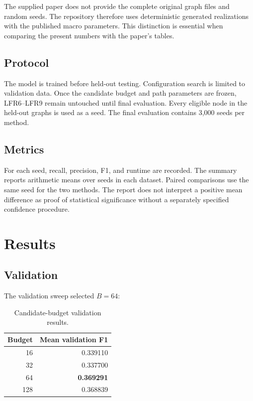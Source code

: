 \documentclass[10pt,journal,compsoc]{IEEEtran}
\begin{document}
The supplied paper does not provide the complete original graph files and
random seeds. The repository therefore uses deterministic generated
realizations with the published macro parameters. This distinction is
essential when comparing the present numbers with the paper's tables.

\subsection{Protocol}
The model is trained before held-out testing. Configuration search is limited
to validation data. Once the candidate budget and path parameters are frozen,
LFR6--LFR9 remain untouched until final evaluation. Every eligible node in the
held-out graphs is used as a seed. The final evaluation contains 3,000 seeds
per method.

\subsection{Metrics}
For each seed, recall, precision, F1, and runtime are recorded. The summary
reports arithmetic means over seeds in each dataset. Paired comparisons use
the same seed for the two methods. The report does not interpret a positive
mean difference as proof of statistical significance without a separately
specified confidence procedure.

\section{Results}
\subsection{Validation}
The validation sweep selected $B=64$:
\begin{table}[t]
\caption{Candidate-budget validation results.}
\label{tab:validation}
\centering
\begin{tabular}{rr}
\toprule
Budget & Mean validation F1\\
\midrule
16 & 0.339110\\
32 & 0.337700\\
64 & \textbf{0.369291}\\
128 & 0.368839\\
\bottomrule
\end{tabular}
\end{table}
\end{document}
